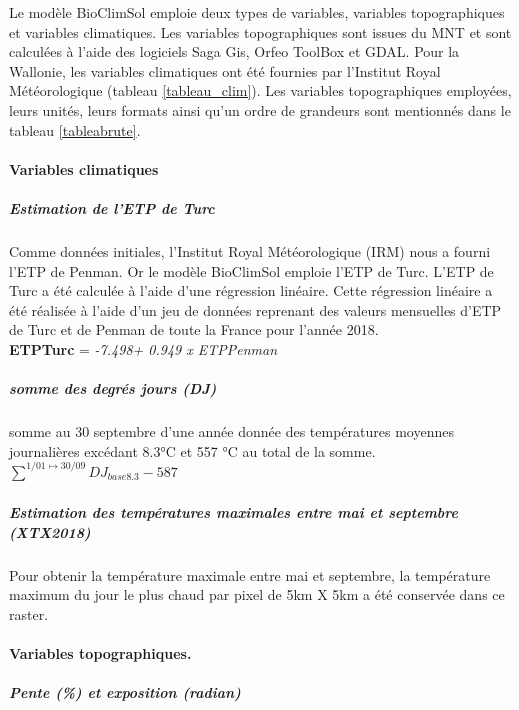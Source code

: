 Le modèle BioClimSol emploie deux types de variables, variables topographiques et variables climatiques.
Les variables topographiques sont issues du MNT et sont calculées à l’aide des logiciels Saga Gis, Orfeo ToolBox et GDAL.
Pour la Wallonie, les variables climatiques ont été fournies par l’Institut Royal Météorologique (tableau \ref{tableau_clim}).
Les variables topographiques employées, leurs unités, leurs formats ainsi qu’un ordre de grandeurs sont mentionnés dans le tableau \ref{tableabrute}.

\paragraph{Variables climatiques}

\subparagraph{Estimation de l’ETP de Turc }

Comme données initiales, l’Institut Royal Météorologique (IRM) nous a fourni l’ETP de Penman. Or le modèle BioClimSol emploie l’ETP de Turc. L’ETP de Turc a été calculée à l’aide d’une régression linéaire. Cette régression linéaire a été réalisée à l’aide d’un jeu de données reprenant des valeurs mensuelles d’ETP de Turc et de Penman de toute la France pour l’année 2018. \\ 

\textbf{ETP\textunderscore Turc} = \textit{ -7.498+ 0.949 x ETP\textunderscore Penman }



\subparagraph{somme des degrés jours (DJ) }


somme au 30 septembre d’une année donnée des
températures moyennes journalières excédant 8.3°C et 557 °C au total de la somme.
\\
$\sum_{}^{1/01 \mapsto 30/09}  DJ_{base 8.3} - 587$




\subparagraph{Estimation des températures maximales entre mai et septembre (XTX2018)}
Pour obtenir la température maximale entre mai et septembre, la température maximum du jour le plus chaud par pixel de 5km X 5km a été conservée dans ce raster.




\paragraph{Variables topographiques.}




\subparagraph{	Pente (\%) et exposition (radian) } 

